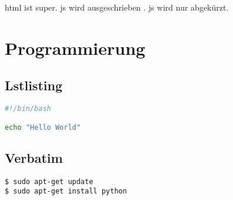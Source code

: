 \ac{html} ist super. \acf{js} wird ausgeschrieben . \acs{js} wird nur abgekürzt.

\chapter{Programmierung}

\section{Lstlisting}

\begin{lstlisting}[language=Bash]
#!/bin/bash

echo "Hello World"
\end{lstlisting}

\section{Verbatim}

\begin{verbatim}
$ sudo apt-get update
$ sudo apt-get install python
\end{verbatim}
